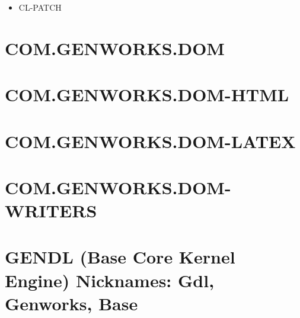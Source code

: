 \documentclass [11pt]{book}
\begin{document}
\label{subsec:functionandmacrodefinitions}



\begin{itemize}

\item {}CL-PATCH

\end{itemize}





\section{COM.GENWORKS.DOM }

\label{sec:com.genworks.dom}







\section{COM.GENWORKS.DOM-HTML }

\label{sec:com.genworks.dom-html}







\section{COM.GENWORKS.DOM-LATEX }

\label{sec:com.genworks.dom-latex}







\section{COM.GENWORKS.DOM-WRITERS }

\label{sec:com.genworks.dom-writers}







\section{GENDL (Base Core Kernel Engine) Nicknames: Gdl, Genworks, Base}

\label{sec:gendl(basecorekernelengine)nicknames:gdl,genworks,base}
\end{document}
